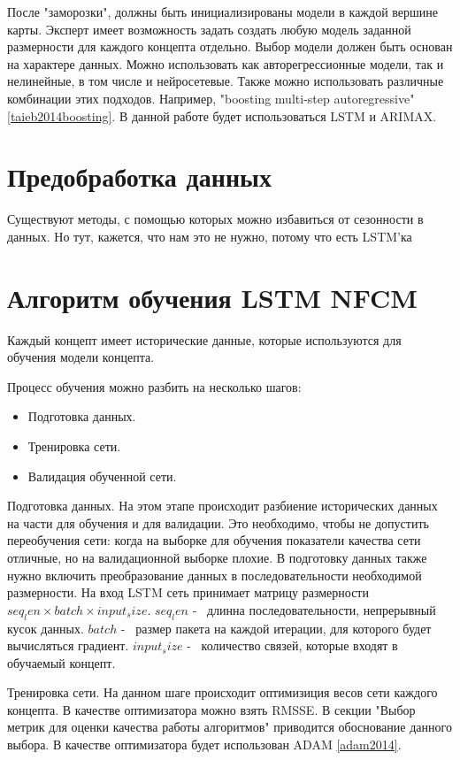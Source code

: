 После "заморозки", должны быть инициализированы модели в каждой вершине
карты. Эксперт имеет возможность задать создать любую модель заданной размерности
для каждого концепта отдельно. Выбор модели должен быть основан
на характере данных. Можно использовать как авторегрессионные модели,
так и нелинейные, в том числе и нейросетевые. Также можно использовать различные комбинации
этих подходов. Например, "boosting multi-step autoregressive" \ref{taieb2014boosting}.
В данной работе будет использоваться LSTM и ARIMAX.

\section{Предобработка данных}

Существуют методы, с помощью которых можно избавиться от сезонности
в данных. Но тут, кажется, что нам это не нужно, потому что есть LSTM'ка

\section{Алгоритм обучения LSTM NFCM}

Каждый концепт имеет исторические данные, которые используются
для обучения модели концепта.

Процесс обучения можно разбить на несколько шагов:

\begin{itemize}
	\item Подготовка данных.
	\item Тренировка сети.
	\item Валидация обученной сети.
\end{itemize}

Подготовка данных. На этом этапе происходит разбиение
исторических данных на части для обучения и для валидации.
Это необходимо, чтобы не допустить переобучения сети:
когда на выборке для обучения показатели качества сети
отличные, но на валидационной выборке плохие.
В подготовку данных также нужно включить преобразование данных
в последовательности необходимой размерности. На вход
LSTM сеть принимает матрицу размерности $ seq_len \times batch \times input_size $.
$ seq_len $ -~ длинна последовательности, непрерывный кусок данных.
$ batch $ -~ размер пакета на каждой итерации, для которого будет вычисляться градиент.
$ input_size $ -~ количество связей, которые входят в обучаемый концепт.

Тренировка сети. На данном шаге происходит оптимизиция весов
сети каждого концепта. В качестве оптимизатора
можно взять RMSSE. %
В секции "Выбор метрик для оценки качества работы алгоритмов"
приводится обоснование данного выбора.
В качестве оптимизатора будет использован ADAM \ref{adam2014}.

